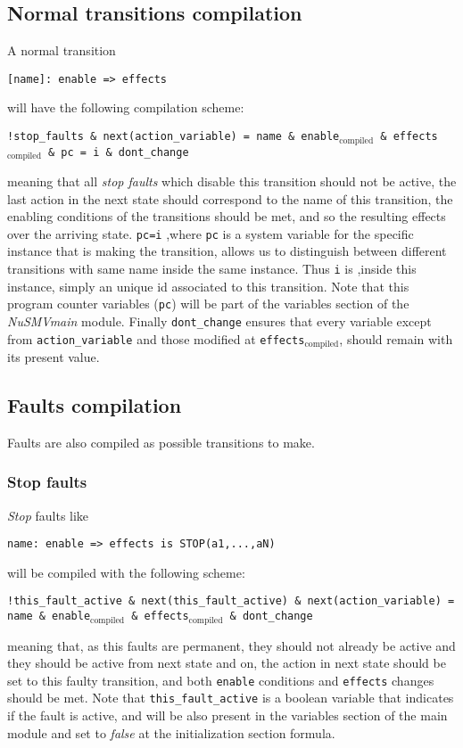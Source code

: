 \documentclass[12pt]{llncs2e/llncs}
\newcommand{\nusmv}{\mbox{\textit{NuSMV}}}
\newcommand{\textusc}[1]{$_{\text{#1}}$} %
\begin{document}
\subsection{Normal transitions compilation}
A normal transition
\begin{center}
\texttt{[name]: enable => effects}
\end{center}
will have the following compilation scheme:
\begin{center}
\texttt{!stop\_faults \& next(action\_variable) = name \& enable\textusc{compiled} \& effects\textusc{compiled} \& pc = i \& dont\_change}
\end{center}
meaning that all \textit{stop faults} which disable this transition should not be active, the last action in the next state should correspond to the name of this transition, the enabling conditions of the transitions should be met, and so the resulting effects over the arriving state. \texttt{pc=i} ,where \texttt{pc} is a system variable for the specific instance that is making the transition, allows us to distinguish between different transitions with same name inside the same instance. Thus \texttt{i} is ,inside this instance, simply an unique id associated to this transition. Note that this program counter variables (\texttt{pc}) will be part of the variables section of the \nusmv \textit{main} module. Finally \texttt{dont\_change} ensures that every variable except from \texttt{action\_variable} and those modified at \texttt{effects\textusc{compiled}}, should remain with its present value. 
\subsection{Faults compilation}
Faults are also compiled as possible transitions to make.
\subsubsection*{Stop faults}
\textit{Stop} faults like
\begin{center}
\texttt{name: enable => effects is STOP(a1,...,aN)}
\end{center}
will be compiled with the following scheme:
\begin{center}
\texttt{!this\_fault\_active \& next(this\_fault\_active) \& next(action\_variable) = name \& enable\textusc{compiled} \& effects\textusc{compiled} \& dont\_change }
\end{center}
meaning that, as this faults are permanent, they should not already be active and they should be active from next state and on, the action in next state should be set to this faulty transition, and both \texttt{enable} conditions and \texttt{effects} changes should be met. Note that \texttt{this\_fault\_active} is a boolean variable that indicates if the fault is active, and will be also present in the variables section of the main module and set to \textit{false} at the initialization section formula.
\end{document}
